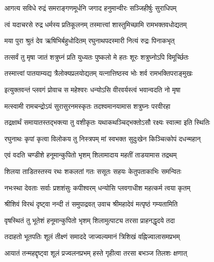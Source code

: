\resetShloka


\twolineshloka
{आगत्य सविधे रुद्रं समराङ्गणमूर्धनि}
{जगाद हनुमान्वीरः सञ्जिहीर्षुः सुराधिपम्}%


\twolineshloka
{त्वं यदाचरसे रुद्र धर्मस्य प्रतिकूलनम्}
{तस्मात्त्वां शास्तुमिच्छामि रामभक्तवधोद्यतम्}%

\twolineshloka
{मया पुरा श्रुतं देव ऋषिभिर्बहुधोदितम्}
{रघुनाथपदस्मारी नित्यं रुद्रः पिनाकभृत्}%

\twolineshloka
{तत्सर्वं तु मृषा जातं शत्रुघ्नं प्रति युध्यतः}
{पुष्कलो मे हतः शूरः शत्रुघ्नोऽपि विमूर्च्छितः}%

\twolineshloka
{तस्मात्त्वां पातयाम्यद्य त्रैलोक्यप्रलयोद्यतम्}
{यत्नात्तिष्ठस्व भोः शर्व रामभक्तिपराङ्मुखः}%


\twolineshloka
{इत्युक्तवन्तं प्लवगं प्रोवाच स महेश्वरः}
{धन्योऽसि वीरवर्यस्त्वं भवान्वदति नो मृषा}%

\twolineshloka
{मत्स्वामी रामचन्द्रोऽयं सुरासुरनमस्कृतः}
{तदश्वमानयामास शत्रुघ्नः परवीरहा}%

\twolineshloka
{तद्रक्षार्थं समायातस्तद्भक्त्या तु वशीकृतः}
{यथाकथञ्चिद्भक्तोऽसौ रक्ष्यः स्वात्मा इति स्थितिः}%

\twolineshloka
{रघुनाथः कृपां कृत्वा विलोकय तु निस्त्रपम्}
{मां स्वभक्त सुदुःखेन किञ्चित्कोपं दधन्महान्}%


\twolineshloka
{एवं वदति चण्डीशे हनूमान्कुपितो भृशम्}
{शिलामादाय महतीं ताडयामास तद्रथम्}%

\twolineshloka
{शिलया ताडितस्तस्य रथः शकलतां गतः}
{ससूतः सहयः केतुपताकाभिः समन्वितः}%

\twolineshloka
{नभःस्था देवताः सर्वाः प्रशशंसुः कपीश्वरम्}
{धन्योसि प्लवगाधीश महत्कर्म त्वया कृतम्}%

\twolineshloka
{श्रीशिवं विरथं दृष्ट्वा नन्दी तं समुपाद्रवत्}
{उवाच श्रीमहादेवं मत्पृष्ठं गम्यतामिति}%

\twolineshloka
{वृषस्थितं तु भूतेशं हनूमान्कुपितो भृशम्}
{शिलामुत्पाट्य तरसा प्राहनद्धृदये तदा}%

\twolineshloka
{तदाहतो भूतपतिः शूलं तीक्ष्णं समाददे}
{जाज्वल्यमानं त्रिशिखं वह्निज्वालासमप्रभम्}%

\twolineshloka
{आयातं तन्महद्दृष्ट्वा शूलं प्रज्वलनप्रभम्}
{हस्ते गृहीत्वा तरसा बभञ्ज तिलशः क्षणात्}%

